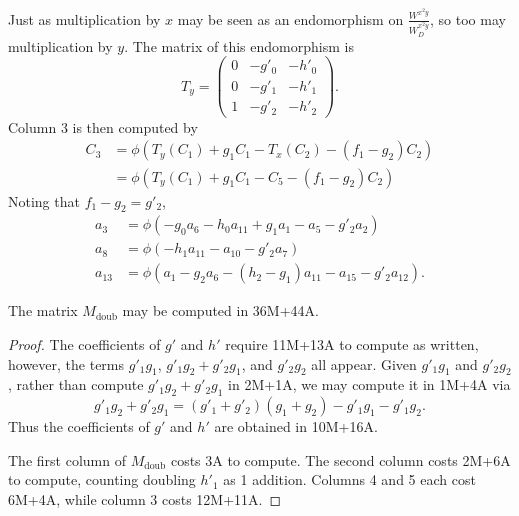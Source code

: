 Just as multiplication by $x$ may be seen as an endomorphism on $\frac {W^{x^2y}}{W_D^{x^2y}}$,
so too may multiplication by $y$. The matrix of this endomorphism is
\[ T_y = \begin{pmatrix}
    0 & -g'_0 & -h'_0 \\
    0 & -g'_1 & -h'_1 \\
    1 & -g'_2 & -h'_2
  \end{pmatrix}. \]
Column 3 is then computed by
\begin{align*}
  C_3 &= \phi \left( T_y(C_1) + g_1C_1 - T_x(C_2) - (f_1 - g_2)C_2 \right) \\
      &= \phi \left( T_y(C_1) + g_1C_1 - C_5 - (f_1 - g_2)C_2 \right)
\end{align*}
Noting that $f_1 - g_2 = g'_2$,
\begin{align*}
  a_3    &= \phi \left(     - g_0a_6 - h_0a_{11} + g_1a_1    - a_5    - g'_2a_2    \right) \\
  a_8    &= \phi \left(              - h_1a_{11}             - a_{10} - g'_2a_7    \right) \\
  a_{13} &= \phi \left( a_1 - g_2a_6 - (h_2 - g_1)a_{11}     - a_{15} - g'_2a_{12} \right) .
\end{align*}
\begin{comment}
\begin{align*}
  a_3    &= \phi \left(     - g_0a_6 - h_0a_{11} + g_1a_1    - a_5    - (f_1 - g_2)a_2    \right) \\
  a_8    &= \phi \left(              - h_1a_{11}             - a_{10} - (f_1 - g_2)a_7    \right) \\
  a_{13} &= \phi \left( a_1 - g_2a_6 - (h_2 - g_1)a_{11}     - a_{15} - (f_1 - g_2)a_{12} \right) .
\end{align*}
\end{comment}

\begin{lemma}
  \label{lem_Mdoub_op_count}
  The matrix $M_{\text{doub}}$ may be computed in 36M+44A.
\end{lemma}
\begin{proof}
  The coefficients of $g'$ and $h'$ require 11M+13A to compute as written,
  however, the terms $g'_1g_1$, $g'_1g_2 + g'_2g_1$, and $g'_2g_2$ all appear.
  Given $g'_1g_1$ and $g'_2g_2$, rather than compute $g'_1g_2 + g'_2g_1$ in 2M+1A,
  we may compute it in 1M+4A via
  \[ g'_1g_2 + g'_2g_1 = (g'_1 + g'_2)(g_1 + g_2) - g'_1g_1 - g'_1g_2. \]
  Thus the coefficients of $g'$ and $h'$ are obtained in 10M+16A.
  
  The first column of $M_{\text{doub}}$ costs 3A to compute.
  The second column costs 2M+6A to compute, counting doubling $h'_1$ as 1 addition.
  Columns 4 and 5 each cost 6M+4A, while column 3 costs 12M+11A.
\end{proof}



